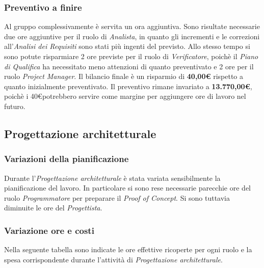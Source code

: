 \subsubsection{Preventivo a finire}
Al gruppo complessivamente è servita un ora aggiuntiva. Sono risultate necessarie due ore aggiuntive per il ruolo di \textit{Analista}, in quanto gli incrementi e le correzioni all'\textit{Analisi dei Requisiti} sono stati più ingenti del previsto. Allo stesso tempo si sono potute risparmiare 2 ore previste per il ruolo di \textit{Verificatore}, poichè il \textit{Piano di Qualifica} ha necessitato meno attenzioni di quanto preventivato e 2 ore per il ruolo \textit{Project Manager}. Il bilancio finale è un risparmio di \textbf{40,00\euro} rispetto a quanto inizialmente preventivato. Il preventivo rimane invariato a \textbf{13.770,00\euro}, poichè i 40\euro potrebbero servire come margine per aggiungere ore di lavoro nel futuro.


\subsection{Progettazione architetturale}
\subsubsection{Variazioni della pianificazione}
Durante l'\textit{Progettazione architetturale} è stata variata sensibilmente la pianificazione del lavoro. In particolare si sono rese necessarie parecchie ore del ruolo \textit{Programmatore} per preparare il \textit{Proof of Concept}. Si sono tuttavia diminuite le ore del \textit{Progettista}.

\subsubsection{Variazione ore e costi}
Nella seguente tabella sono indicate le ore effettive ricoperte per ogni ruolo e la spesa corrispondente durante l'attività di \textit{Progettazione architetturale}.

